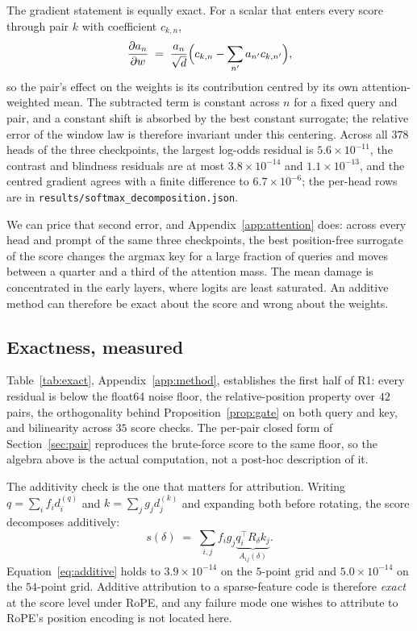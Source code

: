 \documentclass{article}
\theoremstyle{plain}
\theoremstyle{remark}
\newcommand{\R}{R}
\begin{document}
The gradient statement is equally exact. For a scalar that enters every score
through pair $k$ with coefficient $c_{k,n}$,
\begin{equation}
  \frac{\partial a_n}{\partial w}
  \;=\; \frac{a_n}{\sqrt d}
  \Bigl(c_{k,n}-\sum_{n'}a_{n'}c_{k,n'}\Bigr),
  \label{eq:centered}
\end{equation}
so the pair's effect on the weights is its contribution centred by its own
attention-weighted mean. The subtracted term is constant across $n$ for a fixed
query and pair, and a constant shift is absorbed by the best constant
surrogate; the relative error of the window law is therefore invariant under
this centering. Across all $378$ heads of the three checkpoints, the largest
log-odds residual is $5.6\times10^{-11}$, the contrast and blindness residuals
are at most $3.8\times10^{-14}$ and $1.1\times10^{-13}$, and the centred
gradient agrees with a finite difference to $6.7\times10^{-6}$; the per-head
rows are in \texttt{results/softmax\_decomposition.json}.

We can price that second error, and Appendix~\ref{app:attention} does: across
every head and prompt of the same three checkpoints, the best position-free
surrogate of the score changes the argmax key for a large fraction of queries
and moves between a quarter and a third of the attention mass. The mean damage
is concentrated in the early layers, where logits are least saturated. An
additive method can therefore be exact about the score and wrong about the
weights.

\subsection{Exactness, measured}
\label{sec:exact}

Table~\ref{tab:exact}, Appendix~\ref{app:method}, establishes the first half of R1: every residual is below
the float64 noise floor, the relative-position property over $42$ pairs, the
orthogonality behind Proposition~\ref{prop:gate} on both query and key, and
bilinearity across $35$ score checks. The per-pair closed form of
Section~\ref{sec:pair} reproduces the brute-force score to the same floor, so the
algebra above is the actual computation, not a post-hoc description of it.

The additivity check is the one that matters for attribution. Writing
$q = \sum_i f_i d_i^{(q)}$ and $k = \sum_j g_j d_j^{(k)}$ and expanding both
before rotating, the score decomposes additively:
\begin{equation}
  s(\delta) \;=\; \sum_{i,j} f_i g_j
  \underbrace{q_i^{\!\top}\R_{\delta}k_j}_{A_{ij}(\delta)} .
  \label{eq:additive}
\end{equation}
Equation~\ref{eq:additive} holds to $3.9\times10^{-14}$ on the $5$-point grid
and $5.0\times10^{-14}$ on the $54$-point grid. Additive attribution to a
sparse-feature code is therefore \emph{exact} at the score level under RoPE, and
any failure mode one wishes to attribute to RoPE's position encoding is not
located here.
\end{document}
